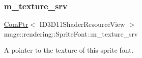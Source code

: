 \subsubsection{\texorpdfstring{m\+\_\+texture\+\_\+srv}{m\_texture\_srv}}
{\footnotesize\ttfamily \hyperlink{namespacemage_ae74f374780900893caa5555d1031fd79}{Com\+Ptr}$<$ I\+D3\+D11\+Shader\+Resource\+View $>$ mage\+::rendering\+::\+Sprite\+Font\+::m\+\_\+texture\+\_\+srv\hspace{0.3cm}{\ttfamily [private]}}

A pointer to the texture of this sprite font. 